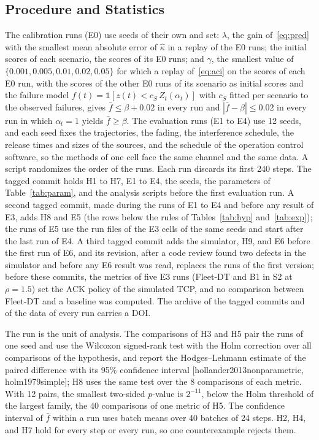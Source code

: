 \subsection{Procedure and Statistics}\label{subsec:proc}

The calibration runs (E0) use seeds of their own and set: $\lambda$, the gain of~\eqref{eq:pred} with the smallest mean absolute error of $\hat{\kappa}$ in a replay of the E0 runs; the initial scores of each scenario, the scores of its E0 runs; and $\gamma$, the smallest value of $\{0.001, 0.005, 0.01, 0.02, 0.05\}$ for which a replay of~\eqref{eq:aci} on the scores of each E0 run, with the scores of the other E0 runs of its scenario as initial scores and the failure model $f(t) = \mathbb{1}[z(t) < c_S\,Z_t(\alpha_t)]$ with $c_S$ fitted per scenario to the observed failures, gives $\bar{f} \leq \beta + 0.02$ in every run and $|\bar{f} - \beta| \leq 0.02$ in every run in which $\alpha_t = 1$ yields $\bar{f} \geq \beta$. The evaluation runs (E1 to E4) use 12 seeds, and each seed fixes the trajectories, the fading, the interference schedule, the release times and sizes of the sources, and the schedule of the operation control software, so the methods of one cell face the same channel and the same data. A script randomizes the order of the runs. Each run discards its first 240 steps. The tagged commit holds H1 to H7, E1 to E4, the seeds, the parameters of Table~\ref{tab:param}, and the analysis scripts before the first evaluation run. A second tagged commit, made during the runs of E1 to E4 and before any result of E3, adds H8 and E5 (the rows below the rules of Tables~\ref{tab:hyp} and~\ref{tab:exp}); the runs of E5 use the run files of the E3 cells of the same seeds and start after the last run of E4. A third tagged commit adds the simulator, H9, and E6 before the first run of E6, and its revision, after a code review found two defects in the simulator and before any E6 result was read, replaces the runs of the first version; before these commits, the metrics of five E3 runs (Fleet-DT and B1 in S2 at $\rho = 1.5$) set the ACK policy of the simulated TCP, and no comparison between Fleet-DT and a baseline was computed. The archive of the tagged commits and of the data of every run carries a DOI.

The run is the unit of analysis. The comparisons of H3 and H5 pair the runs of one seed and use the Wilcoxon signed-rank test with the Holm correction over all comparisons of the hypothesis, and report the Hodges--Lehmann estimate of the paired difference with its 95\% confidence interval [hollander2013nonparametric, holm1979simple]; H8 uses the same test over the 8 comparisons of each metric. With 12 pairs, the smallest two-sided $p$-value is $2^{-11}$, below the Holm threshold of the largest family, the 40 comparisons of one metric of H5. The confidence interval of $\bar{f}$ within a run uses batch means over 40 batches of 24 steps. H2, H4, and H7 hold for every step or every run, so one counterexample rejects them.
